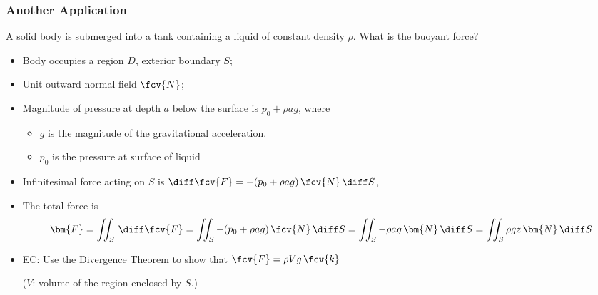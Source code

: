\begin{frame}
  \frametitle{Another Application}

A solid body is submerged into a tank containing a liquid of constant density $\rho$. What is the buoyant force?

\begin{itemize}
  \item \pause Body occupies a region $D$, exterior boundary $S$;
  \item Unit outward normal field $\fcv{N}$;
  \item \pause Magnitude of pressure at depth $a$ below the surface is $p_0+\rho a g$, where
   \begin{itemize}
     \item $g$ is the magnitude of the gravitational acceleration.
     \item $p_0$ is the pressure at surface of liquid
   \end{itemize}
  \item \pause Infinitesimal force acting on $S$ is $\diff \fcv{F} = -(p_0+\rho a g) \, \fcv{N} \, \diff S$,
  \item  \pause The total force is
%
$$\bm{F} = \iint_S \, \diff \fcv{F} = \iint_S -(p_0+\rho a g) \, \fcv{N} \, \diff S = \iint_S -\rho a g \, \bm{N}\,\diff S = \iint_S \rho g z \, \bm{N}\,\diff S$$
%
\item \pause EC: Use the Divergence Theorem to show that $\fcv{F} = \rho V g \, \fcv{k}$

    ($V$: volume of the region enclosed by $S$.)

\end{itemize}

\end{frame}